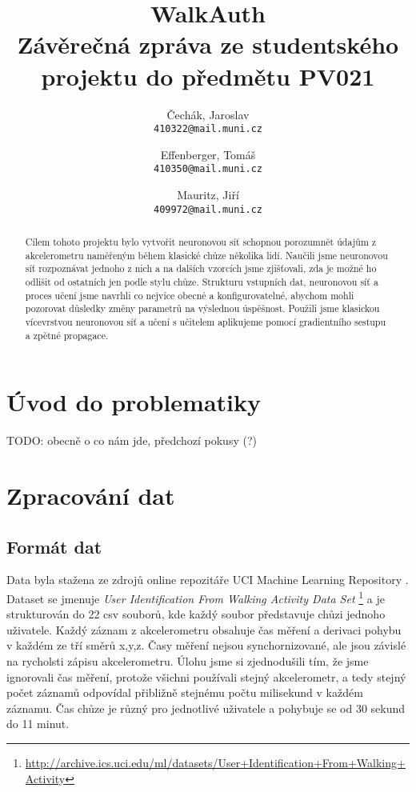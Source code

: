 \documentclass[a4paper, 10pt]{article}
\title{WalkAuth\\
\large Závěrečná zpráva ze studentského projektu do předmětu PV021
}
\author{Čechák, Jaroslav\\
	\texttt{410322@mail.muni.cz}
	\and
	Effenberger, Tomáš\\
	\texttt{410350@mail.muni.cz}
	\and
	Mauritz, Jiří\\
	\texttt{409972@mail.muni.cz}
}
\date{}
\begin{document}
\maketitle


\begin{abstract}
  Cílem tohoto projektu bylo vytvořit neuronovou síť schopnou porozumnět údajům z akcelerometru naměřeným během klasické chůze několika lidí. Naučili jsme neuronovou síť rozpoznávat jednoho z nich a na dalších vzorcích jsme zjišťovali, zda je možné ho odlišit od ostatních jen podle stylu chůze. Strukturu vstupních dat, neuronovou síť a proces učení jsme navrhli co nejvíce obecné a konfigurovatelné, abychom mohli pozorovat důsledky změny parametrů na výslednou úspěšnost. Použili jsme klasickou vícevrstvou neuronovou síť a učení s učitelem aplikujeme pomocí gradientního sestupu a zpětné propagace.
\end{abstract}

\section{Úvod do problematiky}
    \begin{multicols}{2}
      TODO: obecně o co nám jde, předchozí pokusy (?)
    \end{multicols}

\section{Zpracování dat}
    \subsection{Formát dat}
      \begin{multicols}{2}
        Data byla stažena ze zdrojů online repozitáře UCI Machine Learning Repository \cite{uci}. Dataset se jmenuje \textit{User Identification From Walking Activity Data Set} \footnote{\url{http://archive.ics.uci.edu/ml/datasets/User+Identification+From+Walking+Activity}} a je strukturován do 22 csv souborů, kde každý soubor představuje chůzi jednoho uživatele. Každý záznam z akcelerometru obsahuje čas měření a derivaci pohybu v každém ze tří směrů x,y,z. Časy měření nejsou synchornizované, ale jsou závislé na rycholsti zápisu akcelerometru. Úlohu jsme si zjednodušili tím, že jsme ignorovali čas měření, protože všichni používali stejný akcelerometr, a tedy stejný počet záznamů odpovídal přibližně stejnému počtu milisekund v každém záznamu. Čas chůze je různý pro jednotlivé uživatele a pohybuje se od 30 sekund do 11 minut.
    \end{multicols}
\end{document}

